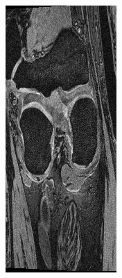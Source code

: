 \documentclass[a4paper,12pt]{article}
\begin{document}
\begin{figure}[H]
    \centering
    \begin{subfigure}[t]{0.4\linewidth}
    \includegraphics[width=\linewidth]{original_2.png}

\end{subfigure}
\end{figure}
\end{document}
